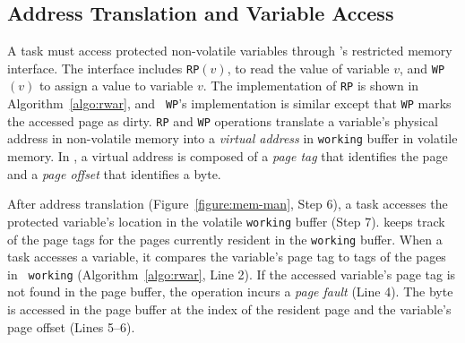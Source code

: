 \subsection{Address Translation and Variable Access}
%
A task must access protected non-volatile variables through \sys's
restricted memory interface. The interface includes \texttt{RP}$(v)$, to read the value of variable
$v$, and \texttt{WP}$(v)$ to assign a value to variable $v$. The
implementation of {\tt RP} is shown in Algorithm~\ref{algo:rwar}, and {\tt
WP}'s implementation is similar except that {\tt WP} marks the accessed page as
dirty.
%
{\tt RP} and {\tt WP} operations translate a variable's physical address in
non-volatile memory into a \emph{virtual address} in \texttt{working} buffer in
volatile memory. In \sys, a virtual address is composed of a \emph{page tag}
that identifies the page and a \emph{page offset} that identifies a byte.
%
\begin{figure}
\end{figure}
%
After address translation (Figure~\ref{figure:mem-man}, Step 6), a task
accesses the protected variable's location in the volatile \texttt{working} buffer
(Step 7). \sys keeps track of the page tags for
the pages currently resident in the \texttt{working} buffer. When a task accesses a
variable, it compares the variable's page tag to tags of the pages in {\tt
working} (Algorithm~\ref{algo:rwar}, Line 2).
%
If the accessed variable's page tag is not found in the page buffer, the
operation incurs a {\em page fault} (Line 4).
%
The byte is accessed in the page buffer at the index of the resident page and
the variable's page offset (Lines 5--6).
%
